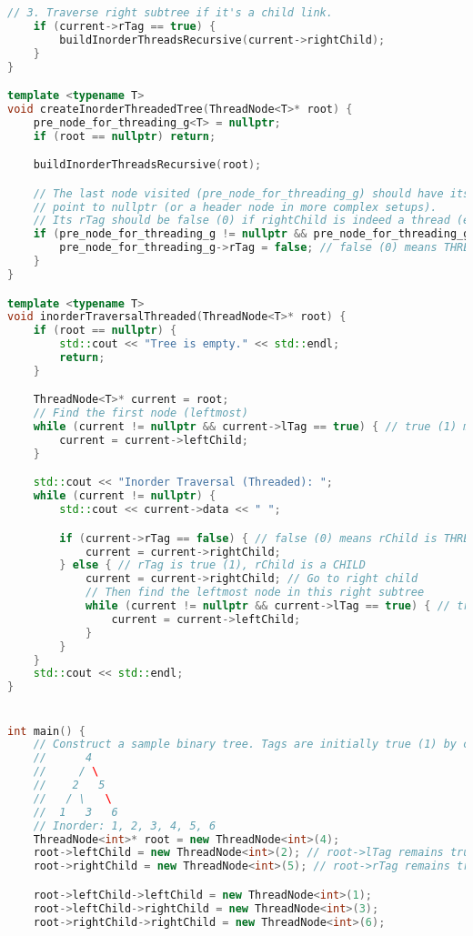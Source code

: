\begin{lstlisting}[language=C++]
    // 3. Traverse right subtree if it's a child link.
    if (current->rTag == true) {
        buildInorderThreadsRecursive(current->rightChild);
    }
}

template <typename T>
void createInorderThreadedTree(ThreadNode<T>* root) {
    pre_node_for_threading_g<T> = nullptr;
    if (root == nullptr) return;

    buildInorderThreadsRecursive(root);

    // The last node visited (pre_node_for_threading_g) should have its right thread
    // point to nullptr (or a header node in more complex setups).
    // Its rTag should be false (0) if rightChild is indeed a thread (even to nullptr).
    if (pre_node_for_threading_g != nullptr && pre_node_for_threading_g->rightChild == nullptr) {
        pre_node_for_threading_g->rTag = false; // false (0) means THREAD to nullptr
    }
}

template <typename T>
void inorderTraversalThreaded(ThreadNode<T>* root) {
    if (root == nullptr) {
        std::cout << "Tree is empty." << std::endl;
        return;
    }

    ThreadNode<T>* current = root;
    // Find the first node (leftmost)
    while (current != nullptr && current->lTag == true) { // true (1) means CHILD link
        current = current->leftChild;
    }

    std::cout << "Inorder Traversal (Threaded): ";
    while (current != nullptr) {
        std::cout << current->data << " ";

        if (current->rTag == false) { // false (0) means rChild is THREAD
            current = current->rightChild;
        } else { // rTag is true (1), rChild is a CHILD
            current = current->rightChild; // Go to right child
            // Then find the leftmost node in this right subtree
            while (current != nullptr && current->lTag == true) { // true (1) means CHILD link
                current = current->leftChild;
            }
        }
    }
    std::cout << std::endl;
}


int main() {
    // Construct a sample binary tree. Tags are initially true (1) by constructor.
    //      4
    //     / \
    //    2   5
    //   / \   \
    //  1   3   6
    // Inorder: 1, 2, 3, 4, 5, 6
    ThreadNode<int>* root = new ThreadNode<int>(4);
    root->leftChild = new ThreadNode<int>(2); // root->lTag remains true (1)
    root->rightChild = new ThreadNode<int>(5); // root->rTag remains true (1)

    root->leftChild->leftChild = new ThreadNode<int>(1);
    root->leftChild->rightChild = new ThreadNode<int>(3);
    root->rightChild->rightChild = new ThreadNode<int>(6);


\end{lstlisting}
